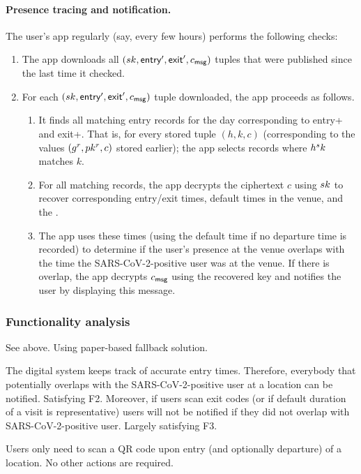 \paragraph{Presence tracing and notification.}
The user’s app regularly (say, every few hours) performs the following checks:
\begin{enumerate}
\item The app downloads all $(sk, \textsf{entry}', \textsf{exit}', c_{\textsf{msg}})$ tuples that were published since the last time it checked.
\item For each $(sk, \textsf{entry}', \textsf{exit}', c_{\textsf{msg}})$ tuple downloaded, the app proceeds as follows.
  \begin{enumerate}
    \item It finds all matching entry records for the day corresponding to entry+ and exit+. That is, for every stored tuple $(h, k, c)$ (corresponding to the values $(g^r, pk^r, c)$ stored earlier); the app selects records where $h^sk$ matches $k$.
    \item For all matching records, the app decrypts the ciphertext $c$ using $sk$ to recover corresponding entry/exit times, default times in the venue, and the \notificationkey.
    \item The app uses these times (using the default time if no departure time is recorded) to determine if the user’s presence at the venue overlaps with the time the SARS-CoV-2-positive user was at the venue. If there is overlap, the app decrypts $c_{\textsf{msg}}$ using the recovered key \notificationkey and notifies the user by displaying this message.
  \end{enumerate}
\end{enumerate}
  
\subsubsection{Functionality analysis}
 See above. Using paper-based fallback solution.

 The digital system keeps track of accurate entry times. Therefore, everybody that potentially overlaps with the SARS-CoV-2-positive user at a location can be notified. Satisfying F2. Moreover, if users scan exit codes (or if default duration of a visit is representative) users will not be notified if they did not overlap with SARS-CoV-2-positive user. Largely satisfying F3.

 Users only need to scan a QR code upon entry (and optionally departure) of a location. No other actions are required.

